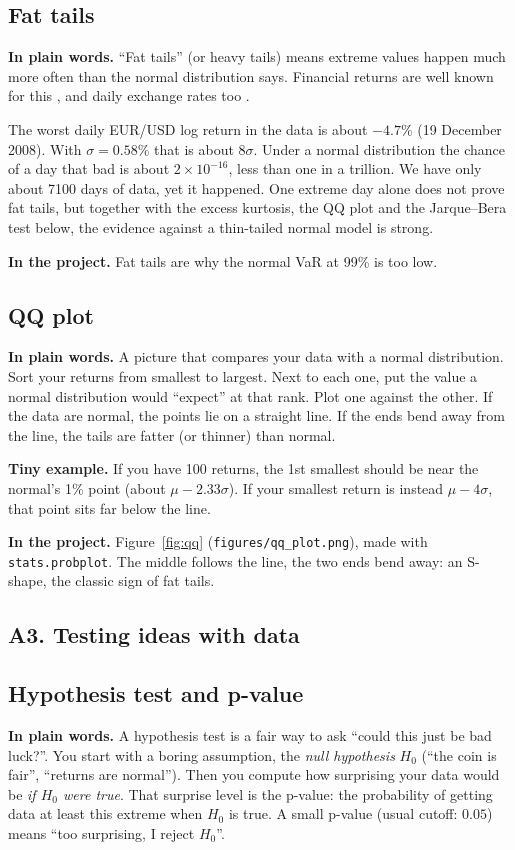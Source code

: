 \documentclass[11pt,a4paper]{article}
\newcommand{\term}[1]{\subsection{#1}}
\newcommand{\plain}{\textbf{In plain words.} }
\newcommand{\inproj}{\textbf{In the project.} }
\newcommand{\tinyex}{\textbf{Tiny example.} }
\newcommand{\code}[1]{\texttt{#1}}
\begin{document}
\term{Fat tails}\label{g:fattails}
\plain ``Fat tails'' (or heavy tails) means extreme values happen much more
often than the normal distribution says. Financial returns are well known
for this \citep{mandelbrot1963,fama1965,cont2001}, and daily exchange rates
too \citep{baillie1989}.

\begin{example}
The worst daily EUR/USD log return in the data is about $-4.7\%$
(19 December 2008). With $\sigma = 0.58\%$ that is about $8\sigma$. Under a
normal distribution the chance of a day that bad is about $2 \times
10^{-16}$, less than one in a trillion. We have only about 7100 days of
data, yet it happened. One extreme day alone does not prove fat tails, but
together with the excess kurtosis, the QQ plot and the Jarque--Bera test
below, the evidence against a thin-tailed normal model is strong.
\end{example}

\inproj Fat tails are why the normal VaR at 99\% is too low.

\term{QQ plot}\label{g:qq}
\plain A picture that compares your data with a normal distribution. Sort
your returns from smallest to largest. Next to each one, put the value a
normal distribution would ``expect'' at that rank. Plot one against the
other. If the data are normal, the points lie on a straight line. If the ends
bend away from the line, the tails are fatter (or thinner) than normal.

\tinyex If you have 100 returns, the 1st smallest should be near the normal's
1\% point (about $\mu - 2.33\sigma$). If your smallest return is instead
$\mu - 4\sigma$, that point sits far below the line.

\inproj Figure~\ref{fig:qq} (\code{figures/qq\_plot.png}), made with
\code{stats.probplot}. The middle follows the line, the two ends bend away:
an S-shape, the classic sign of fat tails.

\subsection*{A3. Testing ideas with data}

\term{Hypothesis test and p-value}\label{g:pvalue}
\plain A hypothesis test is a fair way to ask ``could this just be bad
luck?''. You start with a boring assumption, the \emph{null hypothesis}
$H_0$ (``the coin is fair'', ``returns are normal''). Then you compute how
surprising your data would be \emph{if $H_0$ were true}. That surprise
level is the p-value: the probability of getting data at least this extreme
when $H_0$ is true. A small p-value (usual cutoff: $0.05$) means ``too
surprising, I reject $H_0$''.
\end{document}
